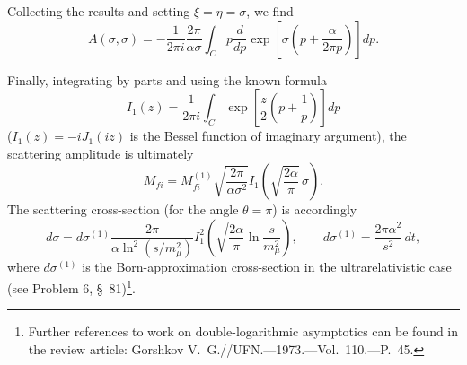 Collecting the results and setting $\xi=\eta=\sigma$, we find
\[
A(\sigma,\sigma)=-\frac{1}{2\pi i}\frac{2\pi}{\alpha\sigma}
\int_C p\frac{d}{dp}\exp\left[\sigma\left(p+\frac{\alpha}{2\pi p}\right)\right]dp.
\]

Finally, integrating by parts and using the known formula
\[
I_1(z)=\frac{1}{2\pi i}\int_C\exp\left[\frac z2\left(p+\frac1p\right)\right]dp
\]
($I_1(z)=-iJ_1(iz)$ is the Bessel function of imaginary argument), the scattering amplitude is ultimately
\begin{equation}
M_{fi}=M_{fi}^{(1)}\sqrt{\frac{2\pi}{\alpha\sigma^2}}
I_1\left(\sqrt{\frac{2\alpha}{\pi}}\,\sigma\right).
\tag{137.28}
\end{equation}
The scattering cross-section (for the angle $\theta=\pi$) is accordingly
\begin{equation}
d\sigma=d\sigma^{(1)}\frac{2\pi}{\alpha\ln^2(s/m_\mu^2)}
I_1^2\left(\sqrt{\frac{2\alpha}{\pi}}\ln\frac{s}{m_\mu^2}\right),
\qquad d\sigma^{(1)}=\frac{2\pi\alpha^2}{s^2}\,dt,
\tag{137.29}
\end{equation}
where $d\sigma^{(1)}$ is the Born-approximation cross-section in the ultrarelativistic case (see Problem 6, \S~81)\footnote{Further references to work on double-logarithmic asymptotics can be found in the review article: Gorshkov V.~G.//UFN.---1973.---Vol.~110.---P.~45.}.
